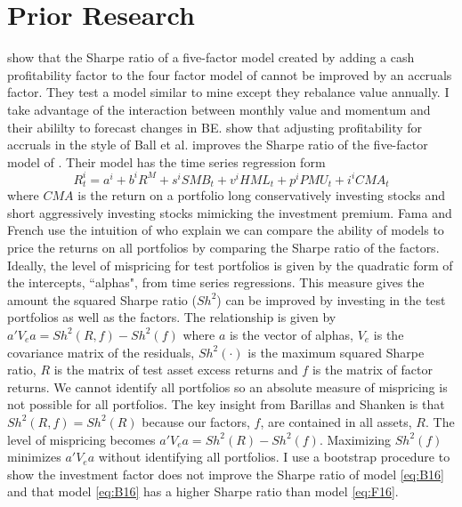 
\section*{Prior Research}

\textcite{ball2016accruals} show that the Sharpe ratio of a five-factor
model created by adding a cash profitability factor to the four factor model
of \textcite{carhart1997persistence} cannot be improved by an accruals factor.
They test a model similar to mine except they rebalance value annually.
I take advantage of the interaction between monthly value and momentum and
their abililty to forecast changes in BE.
\textcite{fama2016choosing} show that adjusting profitability for accruals in
the style of Ball et al. improves the Sharpe ratio of the five-factor model of
\textcite{fama2015five}.
Their model has the time series regression form
\begin{equation} \label{eq:F16}
R_t^i = a^i+b^iR^M+s^iSMB_t+v^iHML_t+p^iPMU_t+i^iCMA_t
\end{equation}
where $CMA$ is the return on a portfolio long conservatively investing stocks
and short aggressively investing stocks mimicking the investment premium.
Fama and French use the intuition of \textcite{barillas2016alpha} who explain
we can compare the ability of models to price the returns on all
portfolios by comparing the Sharpe ratio of the factors.
Ideally, the level of mispricing for test portfolios is given by the
quadratic form of the intercepts, ``alphas", from time series regressions.
This measure gives the amount the squared Sharpe ratio ($Sh^2$) can be
improved by investing in the test portfolios as well as the factors.
The relationship is given by
$a'V_ea=Sh^2\left(R,f\right)-Sh^2\left(f\right)$
where $a$ is the vector of alphas, $V_e$ is the covariance matrix of the
residuals, $Sh^2\left(\cdot\right)$ is the maximum squared Sharpe ratio, $R$ is
the matrix of test asset excess returns and $f$ is the matrix of factor
returns.
We cannot identify all portfolios so an absolute measure of mispricing is not
possible for all portfolios.
The key insight from Barillas and Shanken is that
$Sh^2\left(R,f\right)=Sh^2\left(R\right)$ because our factors, $f$, are
contained in all assets, $R$.
The level of mispricing becomes $a'V_ea=Sh^2\left(R\right)-Sh^2\left(f\right)$.
Maximizing $Sh^2\left(f\right)$ minimizes $a'V_ea$ without
identifying all portfolios.
I use a bootstrap procedure to show the investment factor does not improve the
Sharpe ratio of model \ref{eq:B16} and that model \ref{eq:B16} has a higher
Sharpe ratio than model \ref{eq:F16}.

